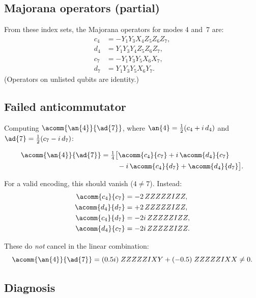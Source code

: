 \subsection*{Majorana operators (partial)}

From these index sets, the Majorana operators for modes 4 and~7 are:
\begin{align*}
  c_4 &= -Y_1 Y_3 X_4 Z_5 Z_6 Z_7, \\
  d_4 &= Y_1 Y_3 Y_4 Z_5 Z_6 Z_7, \\
  c_7 &= -Y_1 Y_3 Y_5 X_6 X_7, \\
  d_7 &= Y_1 Y_3 Y_5 X_6 Y_7.
\end{align*}
(Operators on unlisted qubits are identity.)

\subsection*{Failed anticommutator}

Computing $\acomm{\an{4}}{\ad{7}}$, where
$\an{4} = \frac{1}{2}(c_4 + i\,d_4)$ and
$\ad{7} = \frac{1}{2}(c_7 - i\,d_7)$:

\begin{align*}
  \acomm{\an{4}}{\ad{7}}
    &= \tfrac{1}{4}\bigl[
      \acomm{c_4}{c_7} + i\,\acomm{d_4}{c_7} \\
    &\quad\quad\;  - i\,\acomm{c_4}{d_7} + \acomm{d_4}{d_7}
    \bigr].
\end{align*}

For a valid encoding, this should vanish ($4 \neq 7$).  Instead:
\begin{align*}
  \acomm{c_4}{c_7} &= -2\,ZZZZZIZZ, \\
  \acomm{d_4}{d_7} &= +2\,ZZZZZIZZ, \\
  \acomm{c_4}{d_7} &= -2i\,ZZZZZIZZ, \\
  \acomm{d_4}{c_7} &= -2i\,ZZZZZIZZ.
\end{align*}

These do \emph{not} cancel in the linear combination:
\begin{equation*}
  \acomm{\an{4}}{\ad{7}} = (0.5i)\; ZZZZZIXY + (-0.5)\; ZZZZZIXX
    \neq 0.
\end{equation*}

\subsection*{Diagnosis}

